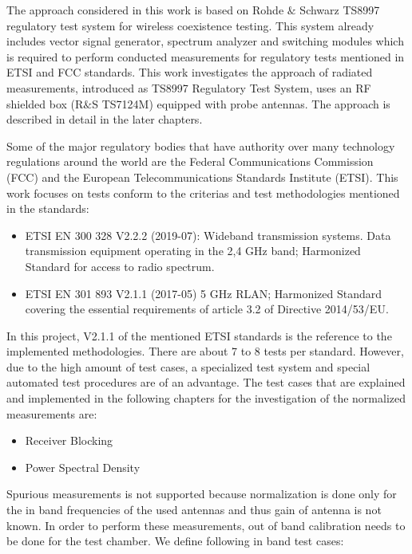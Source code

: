 The approach considered in this work is based on Rohde $\&$ Schwarz TS8997 regulatory test system for wireless coexistence testing. This system already includes vector signal generator, spectrum analyzer and switching modules which is required to perform conducted measurements for regulatory tests mentioned in ETSI and FCC standards. This work investigates the approach of radiated measurements, introduced as TS8997 Regulatory Test System,  uses an RF shielded box (R$\&$S TS7124M) equipped with probe antennas. The approach is described in detail in the later chapters.




Some of the major regulatory bodies that have authority over many technology regulations around the world are the Federal Communications Commission (FCC) and the European Telecommunications Standards Institute (ETSI). This work focuses on tests conform to the criterias and test methodologies mentioned in the standards:
\begin{itemize}
	\item ETSI EN 300 328 V2.2.2 (2019-07): Wideband transmission systems. Data transmission equipment operating in the 2,4 GHz band; Harmonized Standard for access to radio spectrum.

	\item ETSI EN 301 893 V2.1.1 (2017-05) 5 GHz RLAN; Harmonized Standard covering the essential requirements of article 3.2 of Directive 2014/53/EU.
\end{itemize}



In this project, V2.1.1 of the mentioned ETSI standards is the reference to the implemented methodologies. There are about 7 to 8 tests per standard. However, due to the high amount of test cases, a specialized test system and special automated test procedures are of an advantage. The test cases that are explained and implemented in the following chapters for the investigation of the normalized measurements are:
\begin{itemize}
    \item Receiver Blocking
    \item Power Spectral Density
\end{itemize}

Spurious measurements is not supported because normalization is done only for the in band frequencies of the used antennas and thus gain of antenna is not known. In order to perform these measurements, out of band calibration needs to be done for the test chamber. We define following in band test cases:\\

